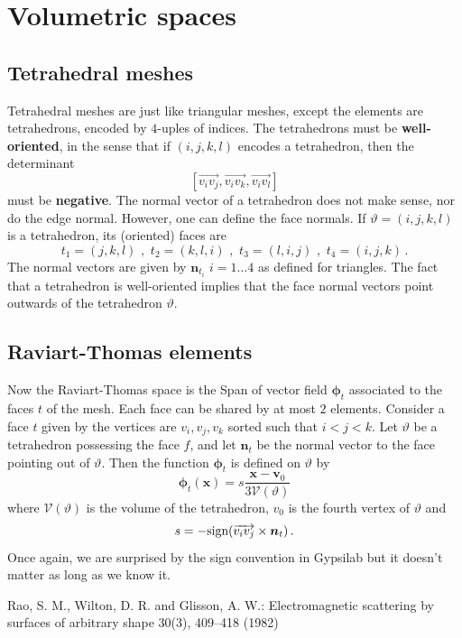 \documentclass[]{article}
\theoremstyle{definition}
\theoremstyle{remark}
\renewcommand*{\vec}[1]{\boldsymbol{#1}}
\begin{document}
\section{Volumetric spaces}

\subsection*{Tetrahedral meshes}

Tetrahedral meshes are just like triangular meshes, except the elements are tetrahedrons, encoded by $4$-uples of indices. The tetrahedrons must be {\textbf{well-oriented}}, in the sense that if $(i,j,k,l)$ encodes a tetrahedron, then the determinant
\[[\overrightarrow{v_iv_j},\overrightarrow{v_iv_k},\overrightarrow{v_iv_l}]\]
must be \textbf{negative}. 
The normal vector of a tetrahedron does not make sense, nor do the edge normal. However, one can define the face normals. If $\vartheta = (i,j,k,l)$ is a tetrahedron, its (oriented) faces are 
\[t_1 = (j,k,l) \,\,,\,\, t_2 = (k,l,i)\,\,,\,\, t_3 = (l,i,j)\,\,,\,\,t_4 = (i,j,k)\,.\] 
The normal vectors are given by $\vec n_{t_i}$ $i = 1\ldots 4$ as defined for triangles. The fact that a tetrahedron is well-oriented implies that the face normal vectors point outwards of the tetrahedron $\vartheta$. 


\subsection*{Raviart-Thomas elements}

Now the Raviart-Thomas space is the Span of vector field $\vec \phi_t$ associated to the faces $t$ of the mesh. Each face can be shared by at most $2$ elements. Consider a face $t$ given by the vertices are $v_i,v_j,v_k$ sorted such that $i < j < k$. Let $\vartheta$ be a tetrahedron possessing the face $f$, and let $\vec n_t$ be the normal vector to the face pointing out of $\vartheta$. Then the function $\vec \phi_t$ is defined on $\vartheta$ by 
\[\vec \phi_t(\vec x) = s\frac{\vec x - \vec v_0}{3\mathcal{V}(\vartheta)}\]
where $\mathcal{V}(\vartheta)$ is the volume of the tetrahedron, $v_0$ is the fourth vertex of $\vartheta$ and 
\[s = - \textup{sign}(\overrightarrow{v_i v_j}\times \vec n_t)\,.\]
Once again, we are surprised by the sign convention in Gypsilab but it doesn't matter as long as we know it. 

\begin{thebibliography}{0}
	Rao, S. M., Wilton, D. R. and Glisson, A. W.:
	\newblock Electromagnetic scattering by surfaces of arbitrary shape 
	 30(3), 409--418 (1982)
\end{thebibliography}
\end{document}
